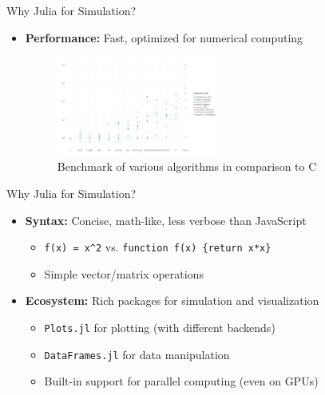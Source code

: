 \begin{frame}{Why Julia for Simulation?}
    \begin{itemize}
        \item \textbf{Performance:} Fast, optimized for numerical computing
              \begin{figure}
                  \centering
                  \includegraphics[width=0.5\textwidth]{../paper/figures/julia_benchmark}
                  \caption{Benchmark of various algorithms in comparison to C \footnotemark}
              \end{figure}
    \end{itemize}
\end{frame}

\begin{frame}{Why Julia for Simulation?}
    \begin{itemize}
        \item \textbf{Syntax:} Concise, math-like, less verbose than JavaScript
              \begin{itemize}
                  \item \texttt{f(x) = x\^{}2} vs. \texttt{function f(x) \{return x*x\}}
                  \item Simple vector/matrix operations
              \end{itemize}
              \vspace{2em}
        \item \textbf{Ecosystem:} Rich packages for simulation and visualization
              \begin{itemize}
                  \item \texttt{Plots.jl} for plotting (with different backends)
                  \item \texttt{DataFrames.jl} for data manipulation
                  \item Built-in support for parallel computing (even on GPUs)
              \end{itemize}
    \end{itemize}
\end{frame}



